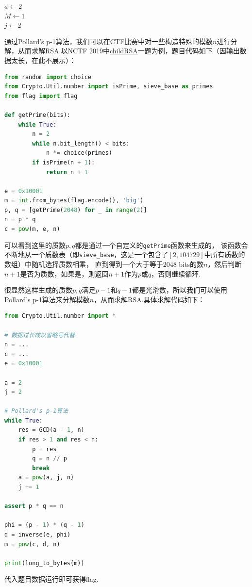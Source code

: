 \documentclass{book}
\numberwithin{equation}{subsubsection}
\begin{document}
\begin{algorithm}[ht!]
    \caption{Pollard's p-1算法}
    $a\leftarrow 2$\\
    $M\leftarrow 1$\\
    $j\leftarrow 2$\\
\end{algorithm}
通过Pollard's p-1算法，我们可以在CTF比赛中对一些构造特殊的模数$n$进行分解，从而求解RSA.以NCTF 2019中\href{https://www.nssctf.cn/problem/1287}{childRSA}一题为例，题目代码如下（因输出数据太长，在此不展示）：\par
\begin{lstlisting}[language=Python,basicstyle=\ttfamily,breaklines=true,keywordstyle=\bfseries\color{blue}]
from random import choice
from Crypto.Util.number import isPrime, sieve_base as primes
from flag import flag

def getPrime(bits):
    while True:
        n = 2
        while n.bit_length() < bits:
            n *= choice(primes)
        if isPrime(n + 1):
            return n + 1

e = 0x10001
m = int.from_bytes(flag.encode(), 'big')
p, q = [getPrime(2048) for _ in range(2)]
n = p * q
c = pow(m, e, n)
\end{lstlisting}
可以看到这里的质数$p,q$都是通过一个自定义的\texttt{getPrime}函数来生成的，
该函数会不断地从一个质数表（即\texttt{sieve\_base}，这是一个包含了$[2,104729]$中所有质数的数组）中随机选择质数相乘，
直到得到一个大于等于2048 bits的数$n$，然后判断$n+1$是否为质数，如果是，则返回$n+1$作为$p$或$q$，否则继续循环.\par
很显然这样生成的质数$p,q$满足$p-1$和$q-1$都是光滑数，所以我们可以使用Pollard's p-1算法来分解模数$n$，从而求解RSA.具体求解代码如下：\par
\begin{lstlisting}[language=Python,basicstyle=\ttfamily,breaklines=true,keywordstyle=\bfseries\color{blue}]
from Crypto.Util.number import *

# 数据过长故以省略号代替
n = ...
c = ...
e = 0x10001

a = 2
j = 2

# Pollard's p-1算法
while True:
    res = GCD(a - 1, n)
    if res > 1 and res < n:
        p = res
        q = n // p
        break
    a = pow(a, j, n)
    j += 1

assert p * q == n

phi = (p - 1) * (q - 1)
d = inverse(e, phi)
m = pow(c, d, n)

print(long_to_bytes(m))
\end{lstlisting}
代入题目数据运行即可获得flag.\par
\end{document}
